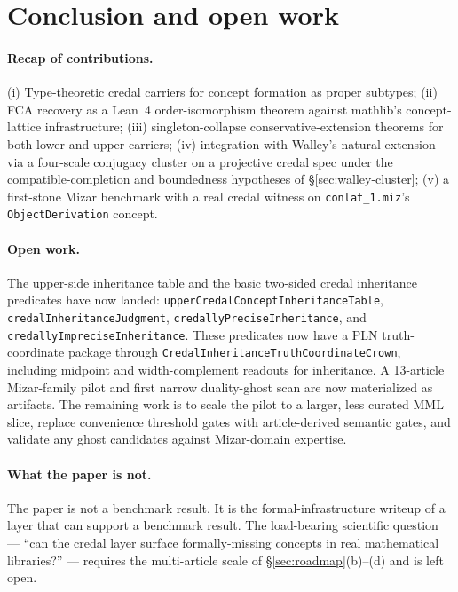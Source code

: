 \documentclass[]{article}
\newcommand{\lid}[1]{{\ttfamily\nolinkurl{#1}}}
\begin{document}
\section{Conclusion and open work}\label{sec:conclusion}

\paragraph{Recap of contributions.} (i) Type-theoretic credal carriers for
concept formation as proper subtypes; (ii) FCA recovery as a Lean~4
order-isomorphism theorem against mathlib's concept-lattice infrastructure;
(iii) singleton-collapse conservative-extension theorems for both lower and upper
carriers; (iv) integration with Walley's natural extension via a four-scale
conjugacy cluster on a projective credal spec under the compatible-completion
and boundedness hypotheses of \S\ref{sec:walley-cluster}; (v) a first-stone Mizar benchmark
with a real credal witness on \lid{conlat\_1.miz}'s \lid{ObjectDerivation} concept.

\paragraph{Open work.} The upper-side inheritance table and the basic two-sided
credal inheritance predicates have now landed:
\lid{upperCredalConceptInheritanceTable},
\lid{credalInheritanceJudgment}, \lid{credallyPreciseInheritance}, and
\lid{credallyImpreciseInheritance}. These predicates now have a PLN
truth-coordinate package through \lid{CredalInheritanceTruthCoordinateCrown},
including midpoint and width-complement readouts for inheritance. A 13-article
Mizar-family pilot and first narrow duality-ghost scan are now materialized as
artifacts. The remaining work is to scale the pilot to a larger, less curated MML
slice, replace convenience threshold gates with article-derived semantic gates, and
validate any ghost candidates against Mizar-domain expertise.

\paragraph{What the paper is not.} The paper is not a benchmark result. It is the
formal-infrastructure writeup of a layer that can support a benchmark result. The
load-bearing scientific question --- ``can the credal layer surface
formally-missing concepts in real mathematical libraries?'' --- requires the
multi-article scale of \S\ref{sec:roadmap}(b)--(d) and is left open.
\end{document}
